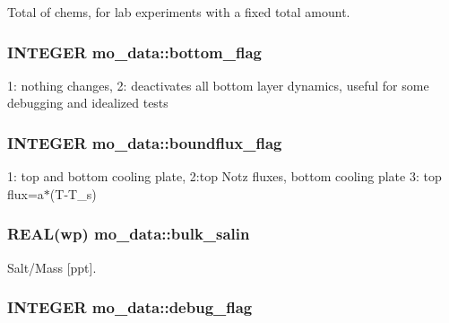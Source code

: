 Total of chems, for lab experiments with a fixed total amount. 

\hypertarget{namespacemo__data_ab9e96b3fd1d356487e156f8634c09732}{
\subsubsection[{bottom\_\-flag}]{\setlength{\rightskip}{0pt plus 5cm}INTEGER {\bf mo\_\-data::bottom\_\-flag}}}
\label{namespacemo__data_ab9e96b3fd1d356487e156f8634c09732}


1: nothing changes, 2: deactivates all bottom layer dynamics, useful for some debugging and idealized tests 

\hypertarget{namespacemo__data_a6089c1127efc972f4488515f75ca8e80}{
\subsubsection[{boundflux\_\-flag}]{\setlength{\rightskip}{0pt plus 5cm}INTEGER {\bf mo\_\-data::boundflux\_\-flag}}}
\label{namespacemo__data_a6089c1127efc972f4488515f75ca8e80}


1: top and bottom cooling plate, 2:top Notz fluxes, bottom cooling plate 3: top flux=a$\ast$(T-\/T\_\-s) 

\hypertarget{namespacemo__data_aadde2b57a3e8c60b5cd6f8a5ee72623d}{
\subsubsection[{bulk\_\-salin}]{\setlength{\rightskip}{0pt plus 5cm}REAL(wp) {\bf mo\_\-data::bulk\_\-salin}}}
\label{namespacemo__data_aadde2b57a3e8c60b5cd6f8a5ee72623d}


Salt/Mass \mbox{[}ppt\mbox{]}. 

\hypertarget{namespacemo__data_a014d834dc753f1d37c0575dc9037878a}{
\subsubsection[{debug\_\-flag}]{\setlength{\rightskip}{0pt plus 5cm}INTEGER {\bf mo\_\-data::debug\_\-flag}}}
\label{namespacemo__data_a014d834dc753f1d37c0575dc9037878a}


